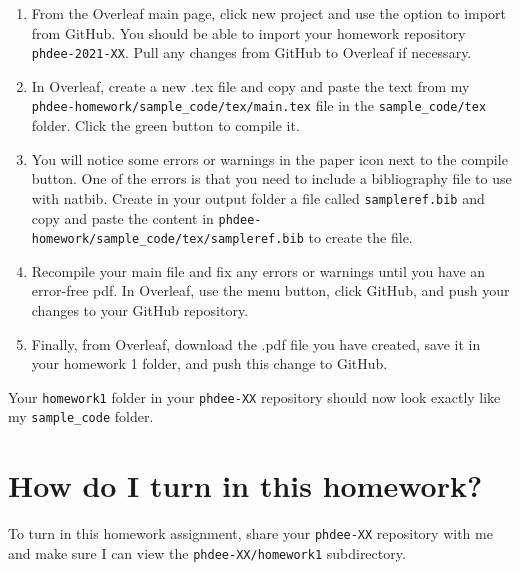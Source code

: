 \documentclass{article}
\begin{document}
\begin{enumerate}
    \item From the Overleaf main page, click new project and use the option to import from GitHub.  You should be able to import your homework repository \verb!phdee-2021-XX!.  Pull any changes from GitHub to Overleaf if necessary.
    \item In Overleaf, create a new .tex file and copy and paste the text from my \verb!phdee-homework/sample_code/tex/main.tex! file in the \verb!sample_code/tex! folder.  Click the green button to compile it.
    \item You will notice some errors or warnings in the paper icon next to the compile button.  One of the errors is that you need to include a bibliography file to use with natbib. Create in your output folder a file called \verb!sampleref.bib! and copy and paste the content in \verb!phdee-homework/sample_code/tex/sampleref.bib! to create the file.
    \item Recompile your main file and fix any errors or warnings until you have an error-free pdf.  In Overleaf, use the menu button, click GitHub, and push your changes to your GitHub repository.
    \item Finally, from Overleaf, download the .pdf file you have created, save it in your homework 1 folder, and push this change to GitHub.
\end{enumerate}
Your \verb!homework1! folder in your \verb!phdee-XX! repository should now look exactly like my \verb!sample_code! folder.

\section{How do I turn in this homework?}

\noindent To turn in this homework assignment, share your \verb!phdee-XX! repository with me and make sure I can view the \verb!phdee-XX/homework1! subdirectory.
\end{document}

